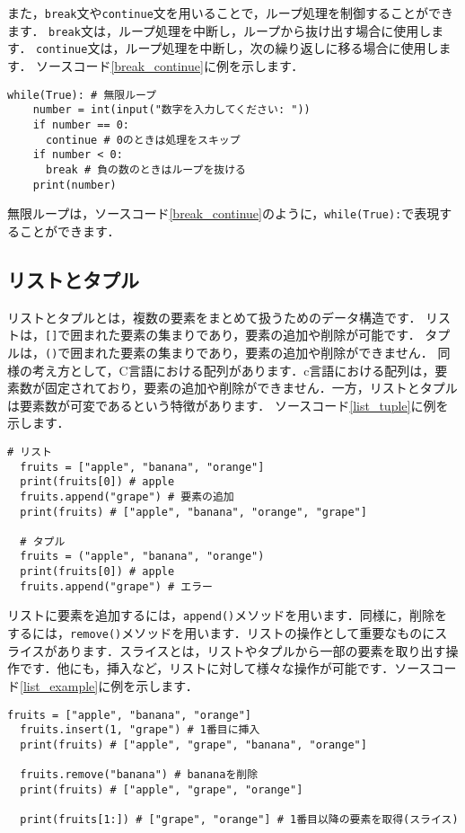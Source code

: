 \documentclass{jarticle}
\begin{document}
また，\texttt{break}文や\texttt{continue}文を用いることで，ループ処理を制御することができます．
\texttt{break}文は，ループ処理を中断し，ループから抜け出す場合に使用します．
\texttt{continue}文は，ループ処理を中断し，次の繰り返しに移る場合に使用します．
ソースコード\ref{break_continue}に例を示します．
\begin{lstlisting}[caption=break文とcontinue文,label=break_continue]
  while(True): # 無限ループ
    number = int(input("数字を入力してください: "))
    if number == 0:
      continue # 0のときは処理をスキップ
    if number < 0:
      break # 負の数のときはループを抜ける
    print(number)
\end{lstlisting}

無限ループは，ソースコード\ref{break_continue}のように，\texttt{while(True):}で表現することができます．

\subsection{リストとタプル}
リストとタプルとは，複数の要素をまとめて扱うためのデータ構造です．
リストは，\texttt{[]}で囲まれた要素の集まりであり，要素の追加や削除が可能です．
タプルは，\texttt{()}で囲まれた要素の集まりであり，要素の追加や削除ができません．
同様の考え方として，C言語における配列があります．c言語における配列は，要素数が固定されており，要素の追加や削除ができません．一方，リストとタプルは要素数が可変であるという特徴があります．
ソースコード\ref{list_tuple}に例を示します．
\begin{lstlisting}[caption=リストとタプル,label=list_tuple]
  # リスト
  fruits = ["apple", "banana", "orange"]
  print(fruits[0]) # apple
  fruits.append("grape") # 要素の追加
  print(fruits) # ["apple", "banana", "orange", "grape"]

  # タプル
  fruits = ("apple", "banana", "orange")
  print(fruits[0]) # apple
  fruits.append("grape") # エラー
\end{lstlisting}

リストに要素を追加するには，\texttt{append()}メソッドを用います．同様に，削除をするには，\texttt{remove()}メソッドを用います．リストの操作として重要なものにスライスがあります．スライスとは，リストやタプルから一部の要素を取り出す操作です．他にも，挿入など，リストに対して様々な操作が可能です．ソースコード\ref{list_example}に例を示します．
\begin{lstlisting}[caption=リストの操作,label=list_example]
  fruits = ["apple", "banana", "orange"]
  fruits.insert(1, "grape") # 1番目に挿入
  print(fruits) # ["apple", "grape", "banana", "orange"]

  fruits.remove("banana") # bananaを削除
  print(fruits) # ["apple", "grape", "orange"]

  print(fruits[1:]) # ["grape", "orange"] # 1番目以降の要素を取得(スライス)
\end{lstlisting}
\end{document}
